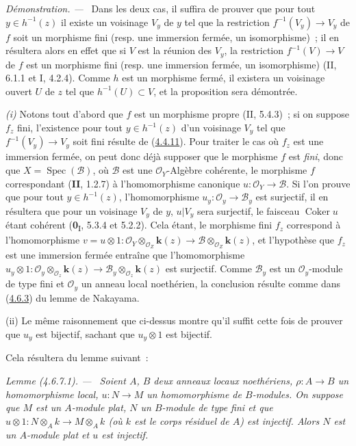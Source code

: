 \documentclass[10pt,oneside]{book}
\newcommand{\oldpage}[2][]{%
  \setcounter{footnote}{0}%
  \marginpar{\scriptsize\textbf{#1}~|~#2}\ignorespaces}
\newenvironment{lemma}[1][]{%
  \par\medskip\noindent\itshape Lemme (#1). ---\ }{\par}
\newenvironment{proof}{%
  \par\medskip\noindent\textit{Démonstration. ---\ }}{\par}
\begin{document}
\begin{proof}
Dans les deux cas, il suffira de prouver que pour tout $y\in h^{-1}(z)$ il
existe un voisinage $V_y$ de $y$ tel que la restriction
$f^{-1}(V_y)\to V_y$ de $f$ soit un morphisme fini (resp. une immersion
fermée, un isomorphisme)~; il en résultera alors en effet que si $V$ est la
réunion des $V_y$, la restriction $f^{-1}(V)\to V$ de $f$ est un morphisme
fini (resp. une immersion fermée, un isomorphisme) (II, 6.1.1 et I, 4.2.4).
Comme $h$ est un morphisme fermé, il existera un voisinage ouvert $U$ de $z$
tel que $h^{-1}(U)\subset V$, et la proposition sera démontrée.

\noindent\textit{(i)} Notons tout d'abord que $f$ est un morphisme propre
(II, 5.4.3)~; si on
\oldpage[III]{143}
suppose $f_z$ fini, l'existence pour tout
$y\in h^{-1}(z)$ d'un voisinage $V_y$ tel que $f^{-1}(V_y)\to V_y$ soit fini
résulte de (\hyperref[III.4.4.11-fr]{4.4.11}).
Pour traiter le cas où $f_z$ est une immersion fermée, on peut donc déjà
supposer que le morphisme $f$ est \emph{fini}, donc que
$X=\operatorname{Spec}(\mathcal B)$, où $\mathcal B$ est une
$\mathcal O_Y$-Algèbre cohérente, le morphisme $f$ correspondant (\textbf{II}, 1.2.7)
à l'homomorphisme canonique $u:\mathcal O_Y\to\mathcal B$. Si l'on prouve
que pour tout $y\in h^{-1}(z)$, l'homomorphisme
$u_y:\mathcal O_y\to\mathcal B_y$ est surjectif, il en résultera que pour un
voisinage $V_y$ de $y$, $u|V_y$ sera surjectif, le faisceau
$\operatorname{Coker}u$ étant cohérent (\textbf{0}\textsubscript{I}, 5.3.4 et 5.2.2).
Cela étant, le morphisme fini $f_z$ correspond à l'homomorphisme
$v=u\otimes1:
\mathcal O_Y\otimes_{\mathcal O_Z}\boldsymbol{k}(z)
\longrightarrow
\mathcal B\otimes_{\mathcal O_Z}\boldsymbol{k}(z)$,
et l'hypothèse que $f_z$ est une immersion fermée entraîne que
l'homomorphisme
$u_y\otimes1:
\mathcal O_y\otimes_{\mathcal O_z}\boldsymbol{k}(z)
\longrightarrow
\mathcal B_y\otimes_{\mathcal O_z}\boldsymbol{k}(z)$
est surjectif. Comme $\mathcal B_y$ est un $\mathcal O_y$-module de type
fini et $\mathcal O_y$ un anneau local noethérien, la conclusion résulte
comme dans (\hyperref[III.4.6.3-fr]{4.6.3}) du lemme de Nakayama.

\noindent (ii) Le même raisonnement que ci-dessus montre qu'il
suffit cette fois de prouver que $u_y$ est bijectif, sachant que
$u_y\otimes1$ est bijectif.

Cela résultera du lemme suivant~:
\end{proof}

\begin{lemma}[4.6.7.1]
\label{III.4.6.7.1-fr}
Soient $A$, $B$ deux anneaux locaux noethériens,
$\rho:A\to B$ un homomorphisme local, $u:N\to M$ un homomorphisme de
$B$-modules. On suppose que $M$ est un $A$-module plat, $N$ un $B$-module
de type fini et que
$u\otimes1:N\otimes_Ak\longrightarrow M\otimes_Ak$
(où $k$ est le corps résiduel de $A$) est injectif. Alors $N$ est un
$A$-module plat et $u$ est injectif.
\end{lemma}
\end{document}
